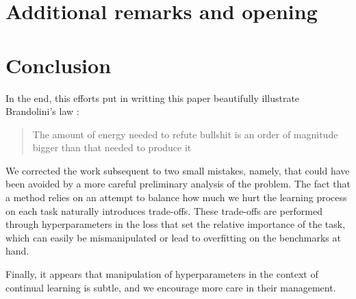 \documentclass[11pt]{article}
\begin{document}
\section{Additional remarks and opening}


\section{Conclusion}



In the end, this efforts put in writting this paper beautifully illustrate Brandolini's law : 
\begin{quote}
    The amount of energy needed to refute bullshit is an order of magnitude bigger than that needed to produce it
\end{quote}
We corrected the work subsequent to two small mistakes, namely, that could have been avoided by a more careful preliminary analysis of the problem. The fact that a method relies on an attempt to balance how much we hurt the learning process on each task naturally introduces trade-offs. These trade-offs are performed through hyperparameters in the loss that set the relative importance of the task, which can easily be mismanipulated or lead to overfitting on the benchmarks at hand.


\vspace{1mm}
\noindent
Finally, it appears that manipulation of hyperparameters in the context of continual learning is subtle, and we encourage more care in their management.



\nocite{*}
\printbibliography
\end{document}
